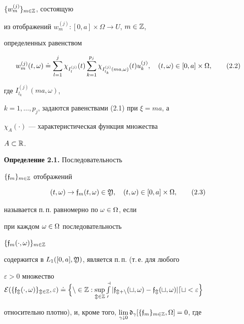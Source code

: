 $\{w_m^{(j)}\}_{m\in\Bbb Z}$, состоящую


из отображений $w_m^{(j)}:[0,a]\times\Omega\to U$, $m\in\Bbb Z$,


определенных равенством


\begin{equation}


w_m^{(j)}\tm\doteq


\sum\limits_{l=1}^j


\chi_{I_l^{(j)}}(t)\sum\limits_{k=1}^{p_j}\chi_{I_{l_k}^{(j)}(ma,\omega)}(t)


u_k^{(j)},\quad \tm\in [0,a]\times \Omega,\tag{2.2}


\end{equation}


где $I_{l_k}^{(j)}(ma,\omega)$,


$k=1,\dotsc,p_j$, задаются равенствами (2.1) при $\xi=ma$, а


$\chi_A (\cdot)$ --- характеристическая функция множества


$A\subset \Bbb R$.


\medskip





{\bf Определение 2.1.} Последовательность


$\{\frak f_m\}_{m\in\Bbb Z}$ отображений


\begin{equation}


\tm\to\gf_m\tm\in\frak Y,\quad \tm\in


[0,a]\times\Omega, \tag{2.3}


\end{equation}


называется п.\,п. равномерно по $\omega\in\Omega$, если


при каждом $\omega\in\Omega$ последовательность


$\{\frak f_m(\cdot,\omega)\}_{m\in\Bbb Z}$


содержится в $L_1([0,a],\frak Y)$, является п.\,п. (т.\,е. для любого


$\varepsilon>0$ множество $\cal E


(\{\gf_m(\cdot,\omega)\}_{m\in\Bbb Z},\varepsilon)\doteq


\Big\{n\in\Bbb Z:


\sup\limits_{m\in\Bbb Z}


\int\limits_0^a |\gf_{m+n}\tm-\gf_m\tm|dt<\varepsilon\Big\}$


относительно плотно), и, кроме того, $\lim\limits_{\gamma\downto


0}\frak d_{\gamma}[\{\gf_m\}_{m\in\Bbb Z},\Omega]=0$, где


